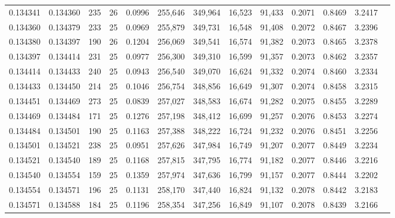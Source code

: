 \begin{tabular}{rrrrrrrrrrrrr}
0.134341 & 0.134360 &   235 &  26 &                                     0.0996 & 255,646 & 349,964 &  16,523 &  91,433 & 0.2071 & 0.8469 & 3.2417 \\
0.134360 & 0.134379 &   233 &  25 &                                     0.0969 & 255,879 & 349,731 &  16,548 &  91,408 & 0.2072 & 0.8467 & 3.2396 \\
0.134380 & 0.134397 &   190 &  26 &                                     0.1204 & 256,069 & 349,541 &  16,574 &  91,382 & 0.2073 & 0.8465 & 3.2378 \\
0.134397 & 0.134414 &   231 &  25 &                                     0.0977 & 256,300 & 349,310 &  16,599 &  91,357 & 0.2073 & 0.8462 & 3.2357 \\
0.134414 & 0.134433 &   240 &  25 &                                     0.0943 & 256,540 & 349,070 &  16,624 &  91,332 & 0.2074 & 0.8460 & 3.2334 \\
0.134433 & 0.134450 &   214 &  25 &                                     0.1046 & 256,754 & 348,856 &  16,649 &  91,307 & 0.2074 & 0.8458 & 3.2315 \\
0.134451 & 0.134469 &   273 &  25 &                                     0.0839 & 257,027 & 348,583 &  16,674 &  91,282 & 0.2075 & 0.8455 & 3.2289 \\
0.134469 & 0.134484 &   171 &  25 &                                     0.1276 & 257,198 & 348,412 &  16,699 &  91,257 & 0.2076 & 0.8453 & 3.2274 \\
0.134484 & 0.134501 &   190 &  25 &                                     0.1163 & 257,388 & 348,222 &  16,724 &  91,232 & 0.2076 & 0.8451 & 3.2256 \\
0.134501 & 0.134521 &   238 &  25 &                                     0.0951 & 257,626 & 347,984 &  16,749 &  91,207 & 0.2077 & 0.8449 & 3.2234 \\
0.134521 & 0.134540 &   189 &  25 &                                     0.1168 & 257,815 & 347,795 &  16,774 &  91,182 & 0.2077 & 0.8446 & 3.2216 \\
0.134540 & 0.134554 &   159 &  25 &                                     0.1359 & 257,974 & 347,636 &  16,799 &  91,157 & 0.2077 & 0.8444 & 3.2202 \\
0.134554 & 0.134571 &   196 &  25 &                                     0.1131 & 258,170 & 347,440 &  16,824 &  91,132 & 0.2078 & 0.8442 & 3.2183 \\
0.134571 & 0.134588 &   184 &  25 &                                     0.1196 & 258,354 & 347,256 &  16,849 &  91,107 & 0.2078 & 0.8439 & 3.2166 \\

\end{tabular}
